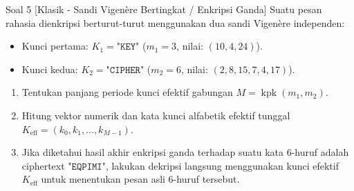 \documentclass[11pt,a4paper]{article}
\begin{document}
\begin{soalklasik}{Soal 5 [Klasik - Sandi Vigenère Bertingkat / Enkripsi Ganda]}
Suatu pesan rahasia dienkripsi berturut-turut menggunakan dua sandi Vigenère independen:
\begin{itemize}
    \item Kunci pertama: $K_1 = \texttt{"KEY"}$ ($m_1 = 3$, nilai: $(10, 4, 24)$).
    \item Kunci kedua: $K_2 = \texttt{"CIPHER"}$ ($m_2 = 6$, nilai: $(2, 8, 15, 7, 4, 17)$).
\end{itemize}
\begin{enumerate}[label=(\alph*)]
    \item Tentukan panjang periode kunci efektif gabungan $M = \operatorname{kpk}(m_1, m_2)$.
    \item Hitung vektor numerik dan kata kunci alfabetik efektif tunggal $K_{\text{eff}} = (k_0, k_1, \dots, k_{M-1})$.
    \item Jika diketahui hasil akhir enkripsi ganda terhadap suatu kata 6-huruf adalah ciphertext $\texttt{"EQPIMI"}$, lakukan dekripsi langsung menggunakan kunci efektif $K_{\text{eff}}$ untuk menentukan pesan asli 6-huruf tersebut.
\end{enumerate}
\end{soalklasik}
\end{document}
